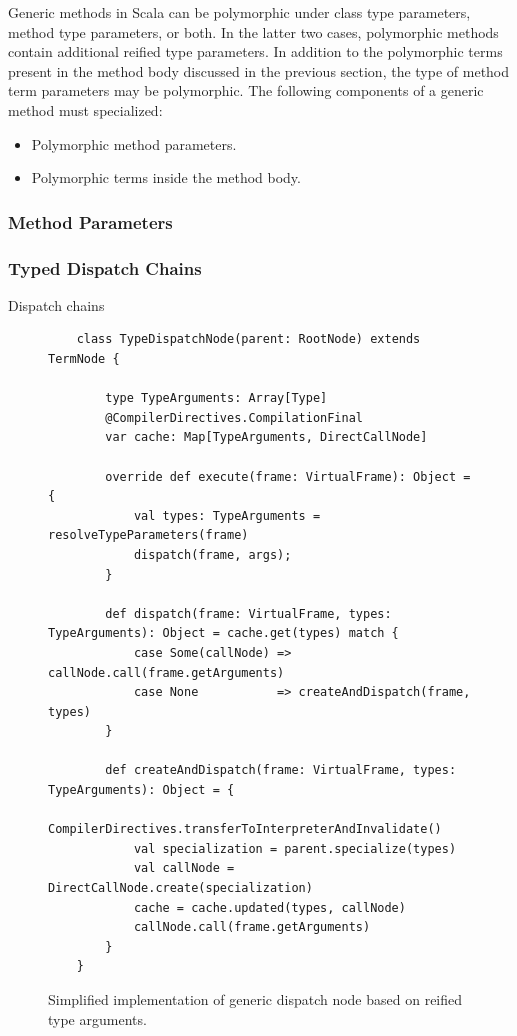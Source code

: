 Generic methods in Scala can be polymorphic under class type parameters, method type parameters, or both. 
In the latter two cases, polymorphic methods contain additional reified type parameters. 
In addition to the polymorphic terms present in the method body discussed in the previous section, the type of method term parameters may be polymorphic. 
The following components of a generic method must specialized:

\begin{itemize}
	\item Polymorphic method parameters.
	\item Polymorphic terms inside the method body.
\end{itemize}


\subsubsection*{Method Parameters}

\subsubsection*{Typed Dispatch Chains}

Dispatch chains\cite{???}

\begin{figure}[!htb]
	\begin{verbatim}
	class TypeDispatchNode(parent: RootNode) extends TermNode {
		
		type TypeArguments: Array[Type]
		@CompilerDirectives.CompilationFinal
		var cache: Map[TypeArguments, DirectCallNode]
		
		override def execute(frame: VirtualFrame): Object = {
			val types: TypeArguments = resolveTypeParameters(frame)
			dispatch(frame, args);
		}
		
		def dispatch(frame: VirtualFrame, types: TypeArguments): Object = cache.get(types) match {
			case Some(callNode) => callNode.call(frame.getArguments)
			case None           => createAndDispatch(frame, types)
		}
		
		def createAndDispatch(frame: VirtualFrame, types: TypeArguments): Object = {
			CompilerDirectives.transferToInterpreterAndInvalidate()
			val specialization = parent.specialize(types)
			val callNode = DirectCallNode.create(specialization)
			cache = cache.updated(types, callNode)
			callNode.call(frame.getArguments)
		}
	}
	\end{verbatim}
\caption{Simplified implementation of generic dispatch node based on reified type arguments.}
\end{figure}

